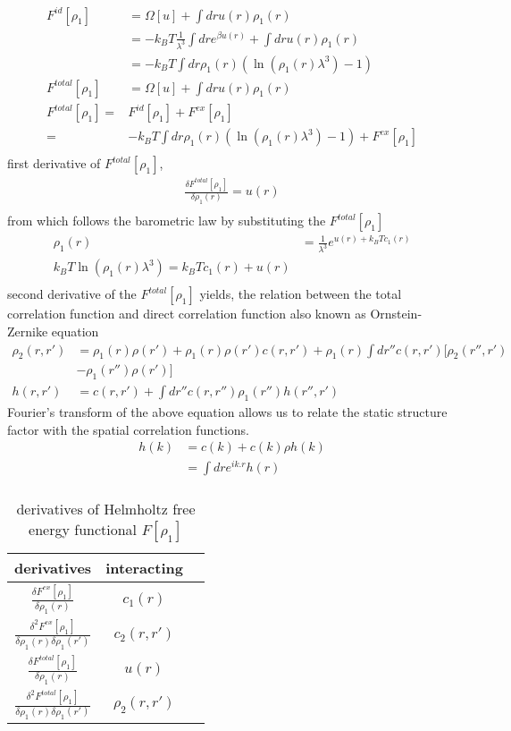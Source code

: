 \documentclass[a4paper]{article}
\begin{document}
\begin{align}
	F^{id}[\rho_1] &= \Omega[u] + \int dr u(r) \rho_1(r)\\
	&= -k_BT\frac{1}{\lambda^3} \int dr e^{\beta u(r)} + \int dr u(r) \rho_1(r)\\
	&= -k_BT\int dr \rho_1(r) (\ln(\rho_1(r) \lambda^3) - 1 )\\
	F^{total}[\rho_1] &= \Omega[u] + \int dr u(r) \rho_1(r)\\
	F^{total}[\rho_1]=&F^{id}[\rho_1] + F^{ex}[\rho_1]\\
	=&-k_BT\int dr \rho_1(r) (\ln(\rho_1(r) \lambda^3) - 1 ) + F^{ex}[\rho_1]\\
\end{align}
first derivative of $F^{total}[\rho_1]$,
\begin{align}
	\frac{\delta F^{total}[\rho_1]}{\delta \rho_1(r)} = u(r)\\
\end{align}
from which follows the barometric law by substituting the $F^{total}[\rho_1]$
\begin{align}
	\rho_1(r) &= \frac{1}{\lambda^3}e^{u(r) + k_BTc_1(r)}\\
	k_BT \ln(\rho_1(r) \lambda^3) = k_BT c_1(r) + u(r)\\
\end{align}
second derivative of the $F^{total}[\rho_1]$ yields,
the relation between the total correlation function and direct correlation function also known as Ornstein-Zernike equation
\begin{align}
	\rho_2(r,r') &= \rho_1(r)\rho(r') + \rho_1(r)\rho(r')c(r,r') + \rho_1(r) \int dr'' c(r,r')[\rho_2(r'',r')\\
	&- \rho_1(r'')\rho(r') ]\\
	h(r,r') &= c(r,r') + \int dr'' c(r,r'')\rho_1(r'')h(r'',r')
\end{align}
Fourier's transform of the above equation allows us to relate the static structure factor with the spatial correlation functions.
\begin{align}
	h(k) &= c(k) + c(k)\rho h(k)\\
	&=\int dr e^{ik.r}h(r)\\
\end{align}

\begin{table}[htbp]
\centering
	\caption{derivatives of Helmholtz free energy functional $F[\rho_1]$}
		\label{tab:directcorrelation}
	\begin{tabular}{ccc}
		derivatives & interacting\\
                \hline
		$\frac{\delta F^{ex}[\rho_1]}{\delta \rho_1(r)}$ & $c_1(r)$\\
                \hline
		$\frac{\delta^2 F^{ex}[\rho_1]}{\delta \rho_1(r) \delta \rho_1(r')}$ & $c_2(r,r')$\\
                \hline
		$\frac{\delta F^{total}[\rho_1]}{\delta \rho_1(r)}$ & $u(r)$\\
                \hline
		$\frac{\delta ^2 F^{total}[\rho_1]}{\delta \rho_1(r) \delta \rho_1(r')}$ & $\rho _2(r,r')$\\
                \hline
\end{tabular}
\end{table}
\end{document}
